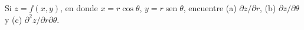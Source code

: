 \item Si $z = f(x, y)$, en donde $x = r \cos \theta$, $y = r \operatorname{sen} \theta$, encuentre (a) $\partial z/\partial r$, (b) $\partial z/\partial \theta$ y (c) $\partial^2 z/\partial r \partial \theta$.

